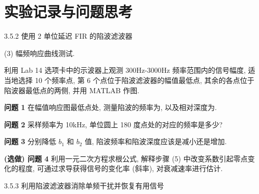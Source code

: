 \documentclass{dspreport}
\begin{document}
\maketitle

\section{实验记录与问题思考}
3.5.2 使用 2 单位延迟 FIR 的陷波滤波器

(3) 幅频响应曲线测试.

利用 Lab 14 选项卡中的示波器上观测 300Hz-3000Hz 频率范围内的信号幅度, 适当地选择 10 个频率点, 第 6 个点位于陷波滤波器的幅值最低点, 其余的各点位于陷波器最低点的两侧, 并用 MATLAB 作图.
\begin{block}

\end{block}

\begin{figure}[H]
    \centering
\end{figure}

\begin{block}

\end{block}

\textbf{问题 1} 在幅值响应图最低点处, 测量陷波的频率为\underline{\blank{  }}, 以及相对深度为\underline{\blank{  }}.

\textbf{问题 2} 采样频率为 10kHz, 单位圆上 180 度点处的对应的频率是多少?
\begin{block}

\end{block}

\textbf{问题 3} 分别降低 $b_1$ 和 $b_2$ 值, 陷波频率和陷波深度应该是减小还是增加.
\begin{block}

\end{block}

\textbf{(选做) 问题 4} 利用一元二次方程求根公式, 解释步骤 (5) 中改变系数引起零点变化的程度, 可通过求导获得信号的变化率 (斜率), 对衰减速率进行估计.
\begin{block}

\end{block}

3.5.3 利用陷波滤波器消除单频干扰并恢复有用信号
\end{document}
